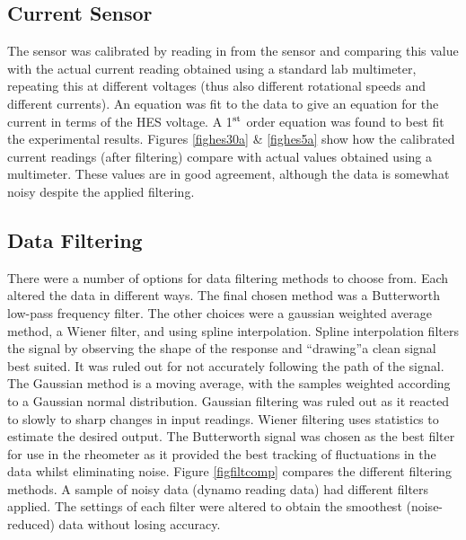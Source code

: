 \documentclass[twoside,a4]{report}
\def\br{\newline \newline \noindent}
\begin{document}
	\subsection*{Current Sensor}
	The sensor was calibrated by reading in from the sensor and comparing this value with the actual current reading obtained using a standard lab multimeter, repeating this at different voltages (thus also different rotational speeds and different currents). An equation was fit to the data to give an equation for the current in terms of the HES voltage. A 1$\rm ^{st}$ order equation was found to best fit the experimental results.\br
	Figures \ref{fighes30a} \& \ref{fighes5a} show how the calibrated current readings (after filtering) compare with actual values obtained using a multimeter. These values are in good agreement, although the data is somewhat noisy despite the applied filtering.
	
	\subsection*{Data Filtering}
	There were a number of options for data filtering methods to choose from. Each altered the data in different ways. The final chosen method was a Butterworth low-pass frequency filter. The other choices were a gaussian weighted average method, a Wiener filter, and using spline interpolation. Spline interpolation filters the signal by observing the shape of the response and ``drawing''a clean signal best suited. It was ruled out for not accurately following the path of the signal. The Gaussian method is a moving average, with the samples weighted according to a Gaussian normal distribution. Gaussian filtering was ruled out as it reacted to slowly to sharp changes in input readings. Wiener filtering uses statistics to estimate the desired output. The Butterworth signal was chosen as the best filter for use in the rheometer as it provided the best tracking of fluctuations in the data whilst eliminating noise.
	\br
	Figure \ref{figfiltcomp} compares the different filtering methods. A sample of noisy data (dynamo reading data) had different filters applied. The settings of each filter were altered to obtain the smoothest (noise-reduced) data without losing accuracy.
	\newline
	
\end{document}
